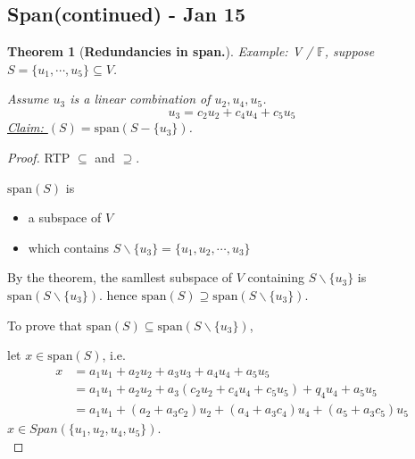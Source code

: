\documentclass[12pt]{article}
\newtheorem{theorem}{Theorem}[subsection]
\newcommand{\Span}{\mathrm{span}}
\newcommand{\mF}{{\mathbb{F}}}
\begin{document}
	



	\newpage
	\subsection{Span(continued) - Jan 15}
	
	\begin{theorem}[\textbf{Redundancies in span.}]
	Example: V / $\mF$, suppose $S = \{u_1,\cdots, u_5\} \subseteq V$. 
	
	Assume $u_3$ is a linear combination of $u_2, u_4, u_5$. 
	\[
		u_3 = c_2u_2 + c_4u_4 + c_5u_5
	\]
	\underline{Claim: } $(S) = \Span (S - \{u_3\})$.
	\end{theorem}

		\begin{proof}
		RTP $\subseteq$ and $\supseteq$.
	
		$\Span (S)$ is
		\begin{itemize}
			\item a subspace of $V$
			\item which contains $S \backslash \{u_3\} = \{u_1, u_2, \cdots,u_3
				\}$ 
		\end{itemize}
		By the theorem, the samllest subspace of $V$ containing $S \backslash 
		\{u_3\}$ is $\Span(S \backslash \{u_3\})$. 
		hence $\Span(S)\supseteq \Span(S\backslash \{u_3\})$.

		To prove that $\Span(S) \subseteq \Span(S \backslash \{u_3\})$,

		let $x\in \Span(S)$, i.e. 
		\begin{align*}
			x &= a_1u_1 + a_2u_2 + a_3u_3 + a_4u_4 + a_5u_5\\
			  &= a_1u_1 + a_2u_2 + a_3(c_2u_2+c_4u_4+c_5u_5)+q_4u_4+a_5u_5\\
			  &=a_1u_1+(a_2+a_3c_2)u_2+(a_4+a_3c_4)u_4+(a_5+a_3c_5)u_5
		\end{align*}
		$x\in Span(\{u_1,u_2,u_4,u_5\})$. \\
	\end{proof}
\end{document}
